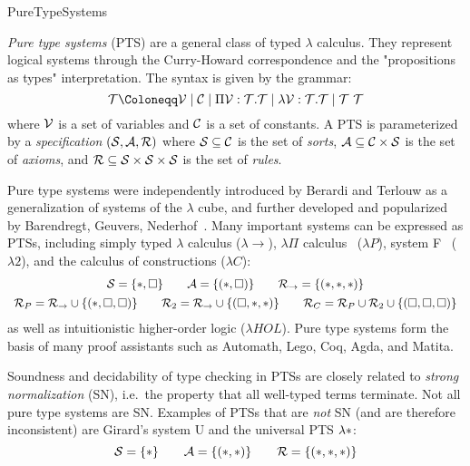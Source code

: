 \begin{entry}{PureTypeSystems}
\begin{clarifications}
\emph{Pure type systems} (PTS) are a general class of typed $\lambda$ calculus. They represent logical systems through the Curry-Howard correspondence and the "propositions as types" interpretation. The syntax is given by the grammar:
\negvspace\[
  \terms \Coloneqq \variables \mid \constants \mid \Pi \variables : \terms. \terms \mid \lambda \variables : \terms. \terms \mid \terms~\terms
\negvspace\]
where $\mathcal{V}$ is a set of variables and $\mathcal{C}$ is a set of constants.
A PTS is parameterized by a \emph{specification} $(\mathcal{S}, \mathcal{A}, \mathcal{R})$ where
$\mathcal{S} \subseteq \mathcal{C}$ is the set of \emph{sorts},
$\mathcal{A} \subseteq \mathcal{C} \times \mathcal{S}$ is the set of \emph{axioms}, and
$\mathcal{R} \subseteq \mathcal{S} \times \mathcal{S} \times \mathcal{S}$ is the set of \emph{rules}.
\end{clarifications}

\begin{history}
Pure type systems were independently introduced by Berardi and Terlouw as a
generalization of systems of the $\lambda$ cube, and further developed and
popularized by Barendregt, Geuvers,
Nederhof~\cite{barendregt_introduction_1991,geuvers_modular_1991,barendregt_lambda_1992,geuvers_logics_1993}.
Many important systems can be expressed as PTSs, including simply typed
$\lambda$ calculus ($\lambda{\rightarrow}$), $\lambda\Pi$ calculus~
($\lambda{P}$), system F~ ($\lambda{2}$), and the calculus of
constructions ($\lambda{C}$):
\negvspace\[
  \begin{array}{cc}
    \sorts = \{\Prop, \Type\} \qquad \axioms = \{(\Prop, \Type)\} \qquad \rules_{\rightarrow} = \{(\Prop, \Prop, \Prop)\} \\[1ex]
    \rules_{P} = \rules_{\rightarrow} \union \{(\Prop,\Type,\Type)\} \qquad
    \rules_{2} = \rules_{\rightarrow} \union \{(\Type,\Prop,\Prop)\} \qquad
    \rules_{C} = \rules_{P} \union \rules_{2} \union \{(\Type,\Type,\Type)\}
  \end{array}
\negvspace\]
as well as intuitionistic higher-order logic ($\lambda{HOL}$). Pure type systems form the basis of many proof assistants such as Automath, Lego, Coq, Agda, and Matita.
\end{history}

\begin{technicalities}
Soundness and decidability of type checking in PTSs are closely related to \emph{strong normalization} (SN), i.e.~the property that all well-typed terms terminate. Not all pure type systems are SN. Examples of PTSs that are \emph{not} SN (and are therefore inconsistent) are Girard's system U and the universal PTS $\lambda{\ast}$:
\negvspace\[
  \sorts = \{\Prop\} \qquad \axioms = \{(\Prop, \Prop)\} \qquad \rules = \{(\Prop, \Prop, \Prop)\}
\negvspace\]
\end{technicalities}



\end{entry}
